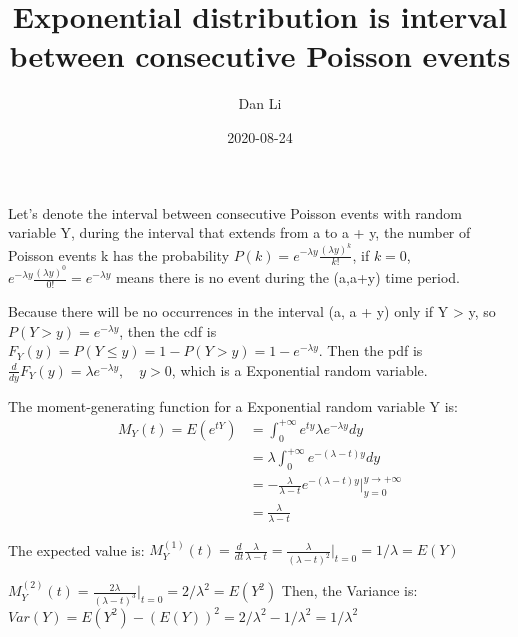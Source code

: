 \documentclass[
]{article}
\title{Exponential distribution is interval between consecutive Poisson
events}
\author{Dan Li}
\date{2020-08-24}
\begin{document}
\maketitle

Let's denote the interval between consecutive Poisson events with random
variable Y, during the interval that extends from a to a + y, the number
of Poisson events k has the probability
\(P(k)=e^{-\lambda y} \frac{(\lambda y)^k}{k!}\), if \(k=0\),
\(e^{-\lambda y}\frac{(\lambda y)^0}{0!}=e^{-\lambda y}\) means there is
no event during the (a,a+y) time period.

Because there will be no occurrences in the interval (a, a + y) only if
Y \textgreater{} y, so \(P(Y > y)=e^{-\lambda y}\), then the cdf is
\(F_Y(y)=P(Y \le y)=1-P(Y > y)=1-e^{-\lambda y}\). Then the pdf is
\(\frac{d}{dy}F_Y(y)=\lambda e^{-\lambda y}, \quad y>0\), which is a
Exponential random variable.

The moment-generating function for a Exponential random variable Y is:
\[
\begin{align}
M_Y(t)=E(e^{tY})&=\int_{0}^{+\infty}e^{ty}\lambda e^{-\lambda y}dy\\
&=\lambda\int_{0}^{+\infty}e^{-(\lambda-t)y}dy\\
&=-\frac{\lambda}{\lambda-t}e^{-(\lambda-t)y}\Big|_{y=0}^{y\to+\infty}\\
&=\frac{\lambda}{\lambda-t}
\end{align}
\]

The expected value is:
\(M_Y^{(1)}(t)=\frac{d}{dt}\frac{\lambda}{\lambda-t}=\frac{\lambda}{(\lambda-t)^2}|_{t=0}=1/\lambda=E(Y)\)

\(M_Y^{(2)}(t)=\frac{2\lambda}{(\lambda-t)^3}|_{t=0}=2/\lambda^2=E(Y^2)\)
Then, the Variance
is:\(Var(Y)=E(Y^2)-(E(Y))^2=2/\lambda^2-1/\lambda^2=1/\lambda^2\)
\end{document}
